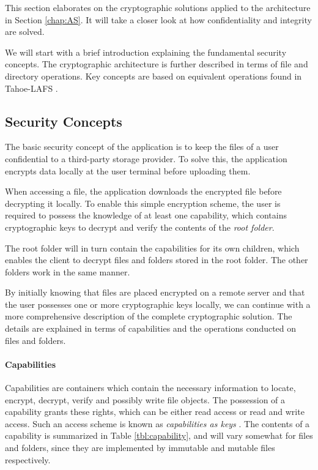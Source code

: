 \documentclass[pdftex,english,10pt,b5paper,twoside]{book}
\begin{document}
This section elaborates on the cryptographic solutions applied to the
architecture in Section \ref{chap:AS}. It will take a closer look at
how confidentiality and integrity are solved.

We will start with a brief introduction explaining the fundamental security
concepts. The cryptographic architecture is further described in terms of file
and directory operations.  Key concepts are based on equivalent operations
found in Tahoe-\ac{LAFS} \cite{tahoe}.

\subsection{Security Concepts}

The basic security concept of the application is to keep the files of a user
confidential to a third-party storage provider. To solve this, the application
encrypts data locally at the user terminal before uploading them.

When accessing a file, the application downloads the encrypted file before
decrypting it locally. To enable this simple encryption scheme, the user is
required to possess the knowledge of at least one capability, which contains
cryptographic keys to decrypt and verify the contents of the \emph{root
folder}.

The root folder will in turn contain the capabilities for its own children,
which enables the client to decrypt files and folders stored in the root
folder. The other folders work in the same manner.

By initially knowing that files are placed encrypted on a remote server and
that the user possesses one or more cryptographic keys locally, we can continue
with a more comprehensive description of the complete cryptographic solution.
The details are explained in terms of capabilities and the operations conducted
on files and folders.

\paragraph{Capabilities} Capabilities are containers which contain the
necessary information to locate, encrypt, decrypt, verify and possibly write
file objects. The possession of a capability grants these rights, which can be
either read access or read and write access. Such an access scheme is known as
\emph{capabilities as keys} \cite{capabilitymyths}. The contents of a
capability is summarized in Table \ref{tbl:capability}, and will vary somewhat
for files and folders, since they are implemented by immutable and mutable
files respectively.
\end{document}
